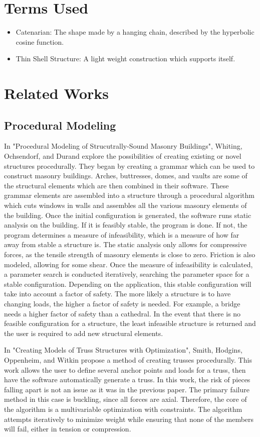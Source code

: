 \documentclass{thesis}
\begin{document}
\section{Terms Used}
\begin{itemize}
\item Catenarian: The shape made by a hanging chain, described by the hyperbolic cosine function.
\item Thin Shell Structure: A light weight construction which supports itself.
\end{itemize}

\section{Related Works}
\subsection{Procedural Modeling}
In "Procedural Modeling of Strucutrally-Sound Masonry Buildings", Whiting, Ochsendorf, and Durand explore
the possibilities of creating existing or novel structures procedurally.  They began by creating a grammar
which can be used to construct masonry buildings.  Arches, buttresses, domes, and vaults are some of the
structural elements which are then combined in their software.  These grammar elements are assembled into
a structure through a procedural algorithm which cuts windows in walls and assembles
all the various masonry elements of the building.  Once the initial configuration is
generated, the software runs static analysis on the building.  If it is feasibly stable, the program is
done.  If not, the program determines a measure of infeasibility, which is a measure of how far away from
stable a structure is.  The static analysis only allows for compressive forces, as the tensile strength of
masonry elements is close to zero.  Friction is also modeled, allowing for some shear.  Once the measure
of infeasibility is calculated, a parameter search is conducted iteratively, searching the parameter space
for a stable configuration.  Depending on the application, this stable configuration will take into account
a factor of safety.  The more likely a structure is to have changing loads, the higher a factor of
safety is needed.  For example, a bridge needs a higher factor of safety than a cathedral.  In the event
that there is no feasible configuration for a structure, the least infeasible structure is returned and the
user is required to add new structural elements.

In "Creating Models of Truss Structures with Optimization", Smith, Hodgins, Oppenheim, and Witkin propose
a method of creating trusses procedurally.  This work allows the user to define several anchor points
and loads for a truss, then have the software automatically generate a truss.  In this work, the risk
of pieces falling apart is not an issue as it was in the previous paper.  The primary failure method
in this case is buckling, since all forces are axial.  Therefore, the core of the algorithm is a
multivariable optimization with constraints.  The algorithm attempts iteratively to minimize weight
while ensuring that none of the members will fail, either in tension or compression.
\end{document}
